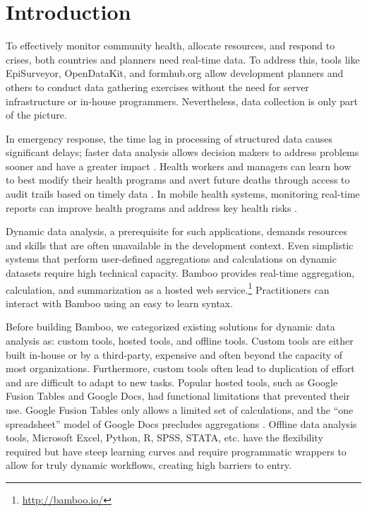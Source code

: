 \documentclass{acm_proc_article-sp}
\begin{document}



\section{Introduction}
To effectively monitor community health, allocate resources, and respond to crises, both countries and planners need real-time data. 
To address this, tools like EpiSurveyor, OpenDataKit, and formhub.org allow development planners and others to conduct data gathering exercises without the need for server infrastructure or in-house programmers.  
Nevertheless, data collection is only part of the picture.

In emergency response, the time lag in processing of structured data causes significant delays; faster data analysis allows decision makers to address problems sooner and have a greater impact \cite{internews}.
Health workers and managers can learn how to best modify their health programs
and avert future deaths
through access to audit trails based on timely data \cite{krisberg}.
In mobile health systems, monitoring real-time reports can improve health programs and address key health risks \cite{mechael}.  

Dynamic data analysis, a prerequisite for such applications, demands resources and skills that are often unavailable in the development context.  Even simplistic systems that perform user-defined aggregations and calculations on dynamic datasets require high technical capacity.  Bamboo provides real-time aggregation, calculation, and summarization as a hosted web service.\footnote{\url{http://bamboo.io/}}  Practitioners can interact with Bamboo using an easy to learn syntax.

Before building Bamboo, we categorized existing solutions for dynamic data
analysis as: custom tools, hosted tools, and offline tools.  Custom tools are
either built in-house or by a third-party, expensive and often beyond the
capacity of most organizations. Furthermore, custom tools often lead to
duplication of effort and are difficult to adapt to new tasks.  Popular hosted
tools, such as Google Fusion Tables and Google Docs, had functional limitations
that prevented their use.  Google Fusion Tables only allows a limited set of
calculations, and the ``one spreadsheet'' model of Google Docs precludes
aggregations \cite{gonzalez1, gonzalez2}.  Offline data analysis tools, Microsoft Excel, Python, R, SPSS, STATA, etc. have the flexibility required but have steep learning curves and require programmatic wrappers to allow for truly dynamic workflows, creating high barriers to entry.
\end{document}
